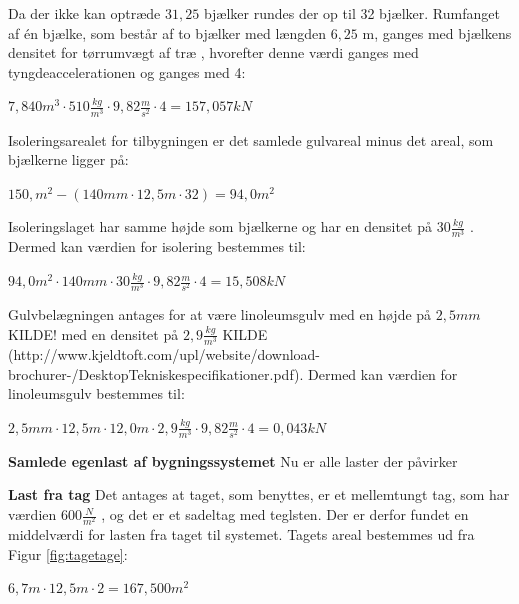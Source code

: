 Da der ikke kan optræde $31,\!25$ bjælker rundes der op til 32 bjælker.
\newline
\newline
Rumfanget af én bjælke, som består af to bjælker med længden $6,\!25$ m, ganges med bjælkens densitet for tørrumvægt af træ \citep{torrumvagt}, hvorefter denne værdi ganges med tyngdeaccelerationen og ganges med 4: 
\begin{center}
	$7,\!840 m^3\cdot 510 \frac{kg}{m^3}\cdot 9,\!82 \frac{m}{s^2}\cdot 4=157,\!057 kN$
\end{center}

Isoleringsarealet for tilbygningen er det samlede gulvareal minus det areal, som bjælkerne ligger på:
\begin{center}
	$150,\! m^2 - (140 mm\cdot 12,\!5 m\cdot 32)=94,\!0 m^2$
\end{center}

Isoleringslaget har samme højde som bjælkerne og har en densitet på $30 \frac{kg}{m^3}$ \citep{densitet}. Dermed kan værdien for isolering bestemmes til:
\begin{center}
	$94,\!0 m^2\cdot 140 mm\cdot 30 \frac{kg}{m^3}\cdot 9,\!82 \frac{m}{s^2}\cdot 4=15,\!508 kN$
\end{center}

Gulvbelægningen antages for at være linoleumsgulv med en højde på $2,\!5 mm$ KILDE! med en densitet på $2,\!9 \frac{kg}{m^3}$ KILDE (http://www.kjeldtoft.com/upl/website/download-brochurer-/DesktopTekniskespecifikationer.pdf). 
Dermed kan værdien for linoleumsgulv bestemmes til:
\begin{center}
	$2,\!5 mm\cdot 12,\!5 m\cdot 12,\!0 m\cdot 2,\!9 \frac{kg}{m^3}\cdot 9,\!82 \frac{m}{s^2}\cdot 4=0,\!043 kN$
\end{center}

\textbf{Samlede egenlast af bygningssystemet}
\newline
Nu er alle laster der påvirker

\textbf{Last fra tag}
\newline
Det antages at taget, som benyttes, er et mellemtungt tag, som har værdien $600 \frac{N}{m^2}$ \citep{tag}, og det er et sadeltag med teglsten. Der er derfor fundet en middelværdi for lasten fra taget til systemet. 
\newline
\newline
Tagets areal bestemmes ud fra Figur \ref{fig:tagetage}:
\begin{center}
	$6,\!7 m\cdot 12,\!5 m \cdot 2=167,\!500 m^2$
\end{center}


